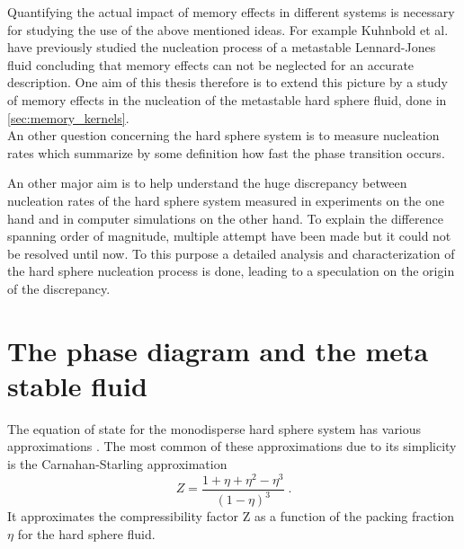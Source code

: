Quantifying the actual impact of memory effects in different systems is necessary for studying the use of the above mentioned ideas. For example Kuhnbold et al. have previously studied the nucleation process of a metastable Lennard-Jones fluid concluding that memory effects can not be neglected for an accurate description. One aim of this thesis therefore is to extend this picture by a study of memory effects in the nucleation of the metastable hard sphere fluid, done in \autoref{sec:memory_kernels}.\\

An other question concerning the hard sphere system is to measure nucleation rates which summarize by some definition how fast the phase transition occurs. 

An other major aim is to help understand the huge discrepancy between nucleation rates of the hard sphere system measured in experiments on the one hand and in computer simulations on the other hand. To explain the difference spanning order of magnitude, multiple attempt have been made but it could not be resolved until now. To this purpose a detailed analysis and characterization of the hard sphere nucleation process is done, leading to a speculation on the origin of the discrepancy.\\

\section{The phase diagram and the meta stable fluid}
\label{sec:HS_phase_diagram}
The equation of state for the monodisperse hard sphere system has various approximations \cite{Mulero2001}. The most common of these approximations due to its simplicity is the Carnahan-Starling approximation\cite{Carnahan1969}
\begin{equation}
\label{eqn:CS}
Z=\frac{1+\eta+\eta^2-\eta^3}{(1-\eta)^3} \; \text{.}
\end{equation}
It approximates the compressibility factor Z as a function of the packing fraction $\eta$ for the hard sphere fluid.\\

